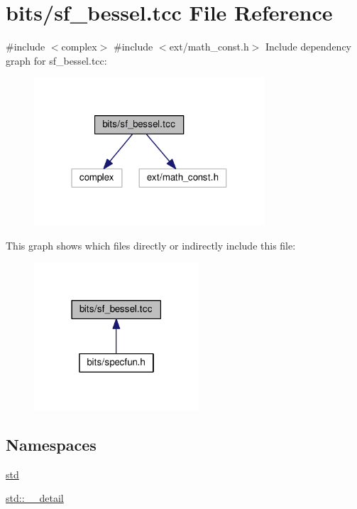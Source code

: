 \hypertarget{sf__bessel_8tcc}{}\section{bits/sf\+\_\+bessel.tcc File Reference}
\label{sf__bessel_8tcc}
{\ttfamily \#include $<$complex$>$}\newline
{\ttfamily \#include $<$ext/math\+\_\+const.\+h$>$}\newline
Include dependency graph for sf\+\_\+bessel.\+tcc\+:
\nopagebreak
\begin{figure}[H]
\begin{center}
\leavevmode
\includegraphics[width=244pt]{sf__bessel_8tcc__incl}
\end{center}
\end{figure}
This graph shows which files directly or indirectly include this file\+:
\nopagebreak
\begin{figure}[H]
\begin{center}
\leavevmode
\includegraphics[width=174pt]{sf__bessel_8tcc__dep__incl}
\end{center}
\end{figure}
\subsection*{Namespaces}
\begin{DoxyCompactItemize}
\item 
 \hyperlink{namespacestd}{std}
\item 
 \hyperlink{namespacestd_1_1____detail}{std\+::\+\_\+\+\_\+detail}
\end{DoxyCompactItemize}
